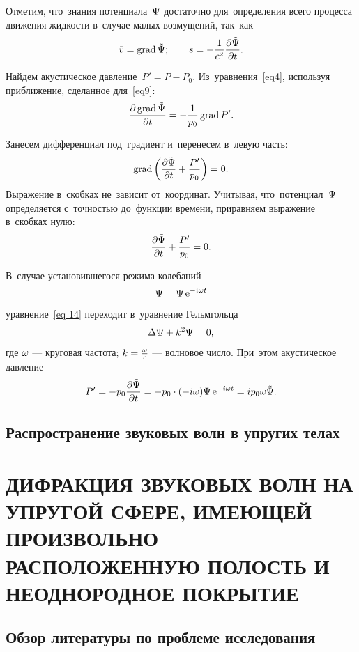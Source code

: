 Отметим, что~знания потенциала~$\tilde\P$ достаточно для~определения всего процесса движения жидкости в~случае малых возмущений, так~как
$$
\bar{v}=\grad\tilde\P;\qq s=-\fr{1}{c^2}\fr{\de\tilde\P}{\de t}.
$$

Найдем акустическое давление~$P'=P-P_0$. Из~уравнения~\eqref{eq4}, используя приближение, сделанное для~\eqref{eq9}:
$$
\fr{\de \grad \tilde\P}{\de t} = - \fr{1}{p_0}\grad P'.
$$

Занесем дифференциал под~градиент и~перенесем в~левую часть:
$$
\grad \left(\fr{\de \tilde\P}{\de t} + \fr{P'}{p_0}\right) = 0.
$$
Выражение в~скобках не~зависит от~координат. Учитывая, что~потенциал~$\tilde\P$ определяется с~точностью до~функции времени, приравняем выражение в~скобках нулю:
$$
\fr{\de \tilde\P}{\de t} + \fr{P'}{p_0} = 0.
$$

В~случае установившегося режима колебаний
\begin{equation}\label{eq 15}
\tilde\P=\P \e^{-i\om t}
\end{equation}
уравнение~\eqref{eq 14} переходит в~уравнение Гельмгольца
\begin{equation}\label{eq 16}
\Lap{\P}+k^2\P=0,
\end{equation}
где $\om$ --- круговая частота; $k=\fr{\om}{c}$ --- волновое число.
При~этом акустическое давление 
$$
P'=-p_0 \fr{\de \tilde\P}{\de t}=-p_0 \cdot (-i \om) \P \e^{-i\omega t}=ip_0\om\tilde{\P}.
$$


\newpage
\subsection{Распространение звуковых волн в упругих телах}


\newpage
\section{ДИФРАКЦИЯ ЗВУКОВЫХ ВОЛН НА УПРУГОЙ СФЕРЕ, ИМЕЮЩЕЙ ПРОИЗВОЛЬНО РАСПОЛОЖЕННУЮ ПОЛОСТЬ И НЕОДНОРОДНОЕ ПОКРЫТИЕ}

\newpage
\subsection{Обзор литературы по проблеме исследования}

\newpage

